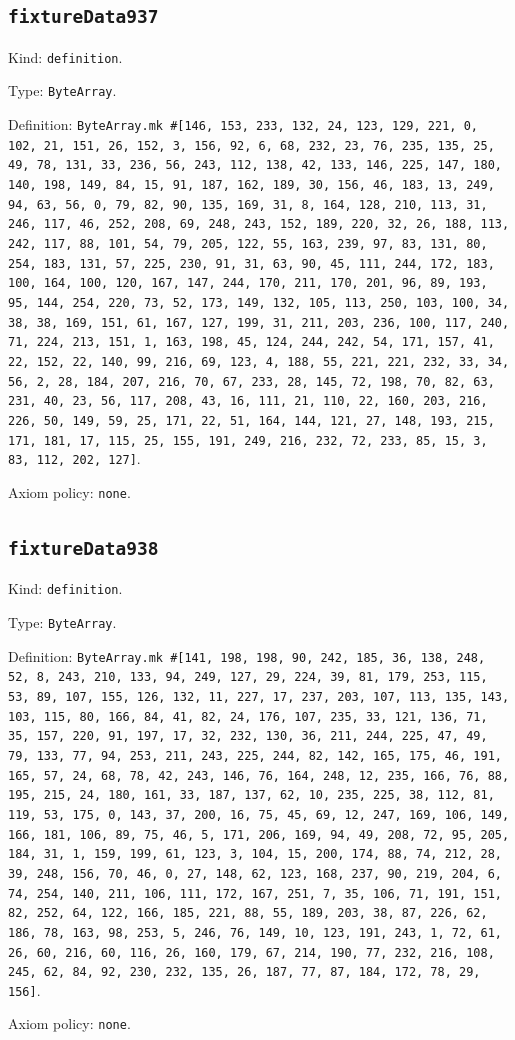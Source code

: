 \documentclass[11pt]{article}
\begin{document}
\subsection*{\texttt{fixtureData937}}
\noindent Kind: \texttt{definition}.\par
\noindent Type: \texttt{ByteArray}.\par
\noindent Definition: \texttt{ByteArray.mk \#[146, 153, 233, 132, 24, 123, 129, 221, 0, 102, 21, 151, 26, 152, 3, 156, 92, 6, 68, 232, 23, 76, 235, 135, 25, 49, 78, 131, 33, 236, 56, 243, 112, 138, 42, 133, 146, 225, 147, 180, 140, 198, 149, 84, 15, 91, 187, 162, 189, 30, 156, 46, 183, 13, 249, 94, 63, 56, 0, 79, 82, 90, 135, 169, 31, 8, 164, 128, 210, 113, 31, 246, 117, 46, 252, 208, 69, 248, 243, 152, 189, 220, 32, 26, 188, 113, 242, 117, 88, 101, 54, 79, 205, 122, 55, 163, 239, 97, 83, 131, 80, 254, 183, 131, 57, 225, 230, 91, 31, 63, 90, 45, 111, 244, 172, 183, 100, 164, 100, 120, 167, 147, 244, 170, 211, 170, 201, 96, 89, 193, 95, 144, 254, 220, 73, 52, 173, 149, 132, 105, 113, 250, 103, 100, 34, 38, 38, 169, 151, 61, 167, 127, 199, 31, 211, 203, 236, 100, 117, 240, 71, 224, 213, 151, 1, 163, 198, 45, 124, 244, 242, 54, 171, 157, 41, 22, 152, 22, 140, 99, 216, 69, 123, 4, 188, 55, 221, 221, 232, 33, 34, 56, 2, 28, 184, 207, 216, 70, 67, 233, 28, 145, 72, 198, 70, 82, 63, 231, 40, 23, 56, 117, 208, 43, 16, 111, 21, 110, 22, 160, 203, 216, 226, 50, 149, 59, 25, 171, 22, 51, 164, 144, 121, 27, 148, 193, 215, 171, 181, 17, 115, 25, 155, 191, 249, 216, 232, 72, 233, 85, 15, 3, 83, 112, 202, 127]}.\par
\noindent Axiom policy: \texttt{none}.\par
\subsection*{\texttt{fixtureData938}}
\noindent Kind: \texttt{definition}.\par
\noindent Type: \texttt{ByteArray}.\par
\noindent Definition: \texttt{ByteArray.mk \#[141, 198, 198, 90, 242, 185, 36, 138, 248, 52, 8, 243, 210, 133, 94, 249, 127, 29, 224, 39, 81, 179, 253, 115, 53, 89, 107, 155, 126, 132, 11, 227, 17, 237, 203, 107, 113, 135, 143, 103, 115, 80, 166, 84, 41, 82, 24, 176, 107, 235, 33, 121, 136, 71, 35, 157, 220, 91, 197, 17, 32, 232, 130, 36, 211, 244, 225, 47, 49, 79, 133, 77, 94, 253, 211, 243, 225, 244, 82, 142, 165, 175, 46, 191, 165, 57, 24, 68, 78, 42, 243, 146, 76, 164, 248, 12, 235, 166, 76, 88, 195, 215, 24, 180, 161, 33, 187, 137, 62, 10, 235, 225, 38, 112, 81, 119, 53, 175, 0, 143, 37, 200, 16, 75, 45, 69, 12, 247, 169, 106, 149, 166, 181, 106, 89, 75, 46, 5, 171, 206, 169, 94, 49, 208, 72, 95, 205, 184, 31, 1, 159, 199, 61, 123, 3, 104, 15, 200, 174, 88, 74, 212, 28, 39, 248, 156, 70, 46, 0, 27, 148, 62, 123, 168, 237, 90, 219, 204, 6, 74, 254, 140, 211, 106, 111, 172, 167, 251, 7, 35, 106, 71, 191, 151, 82, 252, 64, 122, 166, 185, 221, 88, 55, 189, 203, 38, 87, 226, 62, 186, 78, 163, 98, 253, 5, 246, 76, 149, 10, 123, 191, 243, 1, 72, 61, 26, 60, 216, 60, 116, 26, 160, 179, 67, 214, 190, 77, 232, 216, 108, 245, 62, 84, 92, 230, 232, 135, 26, 187, 77, 87, 184, 172, 78, 29, 156]}.\par
\noindent Axiom policy: \texttt{none}.\par
\end{document}
